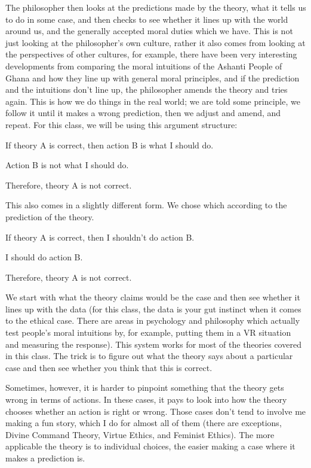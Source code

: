 The philosopher then looks at the predictions made by the theory, what it tells us to do in some case, and then checks to see whether it lines up with the world around us, and the generally accepted moral duties which we have. This is not just looking at the philosopher's own culture, rather it also comes from looking at the perspectives of other cultures, for example, there have been very interesting developments from comparing the moral intuitions of the Ashanti People of Ghana and how they line up with general moral principles, and if the prediction and the intuitions don't line up, the philosopher amends the theory and tries again. This is how we do things in the real world; we are told some principle, we follow it until it makes a wrong prediction, then we adjust and amend, and repeat. For this class, we will be using this argument structure:
\begin{earg}
    \item[]If theory A is correct, then action B is what I should do.
    \item[]Action B is not what I should do.
    \item[]Therefore, theory A is not correct.
\end{earg}
This also comes in a slightly different form. We chose which according to the prediction of the theory.
\begin{earg}
    \item[]If theory A is correct, then I shouldn't do action B.
    \item[]I should do action B.
    \item[]Therefore, theory A is not correct.
\end{earg}
We start with what the theory claims would be the case and then see whether it lines up with the data (for this class, the data is your gut instinct when it comes to the ethical case. There are areas in psychology and philosophy which actually test people's moral intuitions by, for example, putting them in a VR situation and measuring the response). This system works for most of the theories covered in this class. The trick is to figure out what the theory says about a particular case and then see whether you think that this is correct.

Sometimes, however, it is harder to pinpoint something that the theory gets wrong in terms of actions. In these cases, it pays to look into how the theory chooses whether an action is right or wrong. Those cases don’t tend to involve me making a fun story, which I do for almost all of them (there are exceptions, Divine Command Theory, Virtue Ethics, and Feminist Ethics). The more applicable the theory is to individual choices, the easier making a case where it makes a prediction is.
